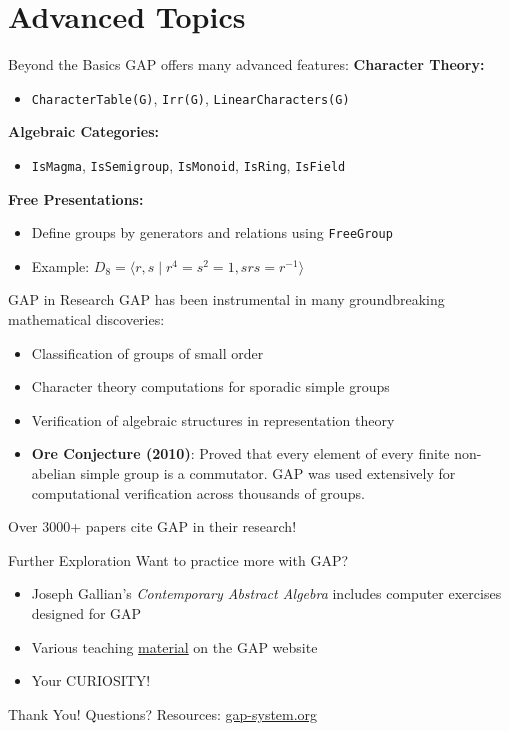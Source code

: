 \documentclass{beamer}
\begin{document}
\section{Advanced Topics}
\begin{frame}[fragile]{Beyond the Basics}
    GAP offers many advanced features:
    \bigbreak
    \textbf{Character Theory:}
    \begin{itemize}
        \item \verb|CharacterTable(G)|, \verb|Irr(G)|, \verb|LinearCharacters(G)|
    \end{itemize}
    \pause
    \textbf{Algebraic Categories:}
    \begin{itemize}
        \item \verb|IsMagma|, \verb|IsSemigroup|, \verb|IsMonoid|, \verb|IsRing|, \verb|IsField|
    \end{itemize}
    \pause
    \textbf{Free Presentations:}
    \begin{itemize}
        \item Define groups by generators and relations using \verb|FreeGroup|
        \item Example: $D_8 = \langle r, s \mid r^4 = s^2 = 1, srs = r^{-1} \rangle$
    \end{itemize}
\end{frame}
\begin{frame}{GAP in Research}
    GAP has been instrumental in many groundbreaking mathematical discoveries:
    \begin{itemize}
        \item<1-> Classification of groups of small order
        \item<2-> Character theory computations for sporadic simple groups
        \item<3-> Verification of algebraic structures in representation theory
        \item<4-> \textbf{Ore Conjecture (2010)}: Proved that every element of every finite non-abelian simple group is a commutator. GAP was used extensively for computational verification across thousands of groups.
    \end{itemize}
    \pause[4]
    \bigbreak
    Over 3000+ papers cite GAP in their research!
\end{frame}
\begin{frame}{Further Exploration}
    Want to practice more with GAP?
    \bigbreak
    \begin{itemize}
        \item<1-> Joseph Gallian's \textit{Contemporary Abstract Algebra} includes computer exercises designed for GAP
        \item<2-> Various teaching \href{https://www.gap-system.org/doc/teach}{material} on the GAP website 
        \item<3-> Your CURIOSITY!
    \end{itemize}
\end{frame}
\begin{frame}
    \centering
    \Huge Thank You!
    \bigbreak
    \bigbreak
    \normalsize
    Questions?
    \bigbreak
    \bigbreak
    \small
    Resources: \href{https://www.gap-system.org/}{gap-system.org}
\end{frame}
\end{document}

